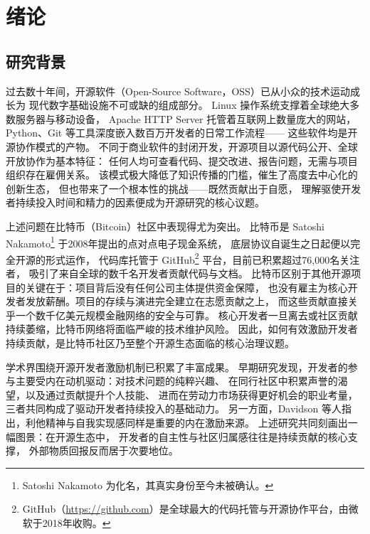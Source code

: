 \tableofcontents
\listoffigures
\listoftables

\mainmatter

\chapter{绪论}

\section{研究背景}

过去数十年间，开源软件（Open-Source Software，OSS）已从小众的技术运动成长为
现代数字基础设施不可或缺的组成部分\cite{lerner2002simple,chen2021opensource}。
Linux 操作系统支撑着全球绝大多数服务器与移动设备，
Apache HTTP Server 托管着互联网上数量庞大的网站，
Python、Git 等工具深度嵌入数百万开发者的日常工作流程——
这些软件均是开源协作模式的产物\cite{lakhani2003open}。
不同于商业软件的封闭开发，开源项目以源代码公开、全球开放协作为基本特征：
任何人均可查看代码、提交改进、报告问题，无需与项目组织存在雇佣关系。
该模式极大降低了知识传播的门槛，催生了高度去中心化的创新生态，
但也带来了一个根本性的挑战——既然贡献出于自愿，
理解驱使开发者持续投入时间和精力的因素便成为开源研究的核心议题。

上述问题在比特币（Bitcoin）社区中表现得尤为突出。
比特币是 Satoshi Nakamoto\footnote{Satoshi Nakamoto 为化名，其真实身份至今未被确认。} 于2008年提出的点对点电子现金系统\cite{nakamoto2008bitcoin,cheng2024bitcoin}，
底层协议自诞生之日起便以完全开源的形式运作，
代码库托管于 GitHub\footnote{GitHub（\url{https://github.com}）是全球最大的代码托管与开源协作平台，由微软于2018年收购。} 平台，目前已积累超过76,000名关注者，
吸引了来自全球的数千名开发者贡献代码与文档。
比特币区别于其他开源项目的关键在于：项目背后没有任何公司主体提供资金保障，
也没有雇主为核心开发者发放薪酬。项目的存续与演进完全建立在志愿贡献之上，
而这些贡献直接关乎一个数千亿美元规模金融网络的安全与可靠。
核心开发者一旦离去或社区贡献持续萎缩，比特币网络将面临严峻的技术维护风险。
因此，如何有效激励开发者持续贡献，是比特币社区乃至整个开源生态面临的核心治理议题。

学术界围绕开源开发者激励机制已积累了丰富成果。
早期研究发现，开发者的参与主要受内在动机驱动：对技术问题的纯粹兴趣\cite{shah2006motivation}、
在同行社区中积累声誉的渴望\cite{lerner2002simple}，以及通过贡献提升个人技能、
进而在劳动力市场获得更好机会的职业考量\cite{fang2009understanding}，
三者共同构成了驱动开发者持续投入的基础动力。
另一方面，Davidson 等人\cite{davidson2014older}指出，利他精神与自我实现感同样是重要的内在激励来源。
上述研究共同刻画出一幅图景：在开源生态中，
开发者的自主性与社区归属感往往是持续贡献的核心支撑，
外部物质回报反而居于次要地位。

